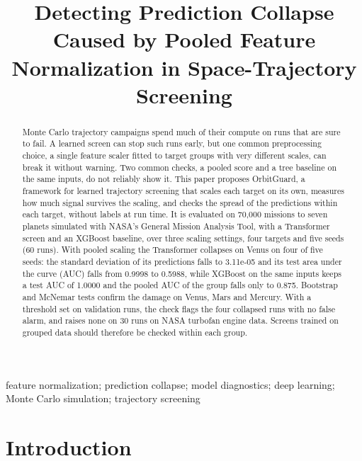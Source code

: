 
\title{Detecting Prediction Collapse Caused by Pooled Feature Normalization in Space-Trajectory Screening}

\begin{abstract}
Monte Carlo trajectory campaigns spend much of their compute on runs that are sure to fail. A learned screen can stop such runs early, but one common preprocessing choice, a single feature scaler fitted to target groups with very different scales, can break it without warning. Two common checks, a pooled score and a tree baseline on the same inputs, do not reliably show it. This paper proposes OrbitGuard, a framework for learned trajectory screening that scales each target on its own, measures how much signal survives the scaling, and checks the spread of the predictions within each target, without labels at run time. It is evaluated on 70,000 missions to seven planets simulated with NASA's General Mission Analysis Tool, with a Transformer screen and an XGBoost baseline, over three scaling settings, four targets and five seeds (60 runs). With pooled scaling the Transformer collapses on Venus on four of five seeds: the standard deviation of its predictions falls to 3.11e-05 and its test area under the curve (AUC) falls from 0.9998 to 0.5988, while XGBoost on the same inputs keeps a test AUC of 1.0000 and the pooled AUC of the group falls only to 0.875. Bootstrap and McNemar tests confirm the damage on Venus, Mars and Mercury. With a threshold set on validation runs, the check flags the four collapsed runs with no false alarm, and raises none on 30 runs on NASA turbofan engine data. Screens trained on grouped data should therefore be checked within each group.
\end{abstract}

\begin{keywords}
feature normalization; prediction collapse; model diagnostics; deep learning; Monte Carlo simulation; trajectory screening
\end{keywords}

\section{Introduction}
\label{sec:intro}

